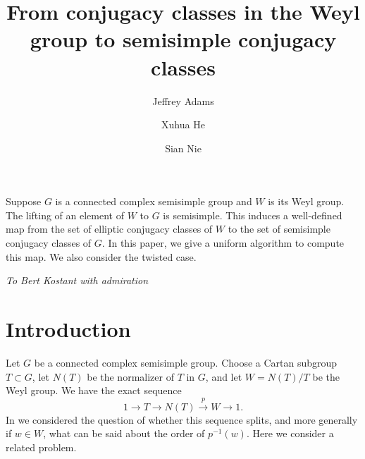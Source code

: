 \documentclass[10pt,leqno]{article}
\renewcommand{\sec}[1]{\section{#1}
\renewcommand{\theequation}{\thesection.\arabic{equation}}
  \setcounter{equation}{0}}
\newcommand\inv{^{-1}}
\renewcommand{\sec}[1]{\section{#1}
\renewcommand{\theequation}{\thesection.\arabic{equation}}
  \setcounter{equation}{0}}
\begin{document}
\author{Jeffrey Adams}
\author{Xuhua He}
\author{Sian Nie}
\date{}                     %


\title{From conjugacy classes in  the Weyl group to semisimple conjugacy classes}


\maketitle

\let\thefootnote\relax{}

\let\thefootnote\relax{}

\let\thefootnote\relax{}

 Suppose $G$ is a connected complex semisimple group
and $W$ is its Weyl group. The lifting of an element of $W$ to $G$ is
semisimple. This induces a well-defined map from the set of elliptic
conjugacy classes of $W$ to the set of semisimple conjugacy classes of
$G$. In this paper, we give a uniform algorithm to compute this
map. We also consider the twisted case.

\begin{center}

  
  \large \emph{To Bert Kostant with admiration}
  \end{center}

\sec{Introduction}

Let $G$ be a connected complex semisimple group.
Choose a Cartan subgroup $T\subset G$, let $N(T)$ be the normalizer of $T$ in $G$,
and let $W=N(T)/T$ be the Weyl group.
We have the exact sequence
\begin{equation}
\label{e:exactW}
1\rightarrow T\rightarrow N(T)\overset p\rightarrow W\rightarrow 1.
\end{equation}
In \cite{AH} we considered the question of whether this sequence splits,
and more generally if $w\in W$, what can be said about the order of $p\inv(w)$.
Here we consider a related problem.
\end{document}
